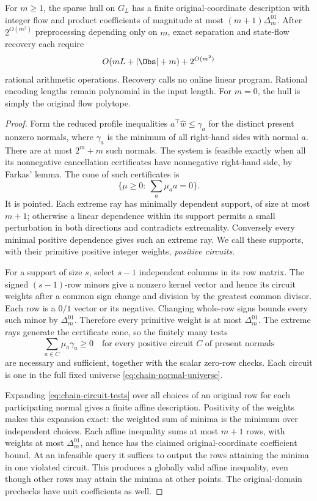 \begin{theorem}\label{thm:fixed-chain}
For $m\ge1$, the sparse hull on $G_L$ has a finite
original-coordinate description with integer flow and product
coefficients of magnitude at most $(m+1)\Delta^{01}_m$.
After $2^{O(m^2)}$ preprocessing depending only on $m$, exact
separation and state-flow recovery each require
\[
 O(mL+|\Obs|+m)+2^{O(m^2)}
\]
rational arithmetic operations. Recovery calls no online linear
program. Rational encoding lengths remain polynomial in the input
length. For $m=0$, the hull is simply the original flow polytope.
\end{theorem}
\begin{proof}
Form the reduced profile inequalities
$a^\top\widehat w\le\gamma_a$ for the distinct present nonzero
normals, where $\gamma_a$ is the minimum of all right-hand sides
with normal $a$. There are at most $2^m+m$ such normals.
The system is feasible exactly when all its nonnegative cancellation
certificates have nonnegative right-hand side, by Farkas' lemma.
The cone of such certificates is
\[
 \{\mu\ge0:\ \sum_a\mu_a a=0\}.
\]
It is pointed. Each extreme ray has minimally dependent support,
of size at most $m+1$; otherwise a linear dependence within its
support permits a small perturbation in both directions and contradicts
extremality. Conversely every minimal positive dependence gives such
an extreme ray. We call these supports, with their primitive positive
integer weights, \emph{positive circuits}.

For a support of size $s$, select $s-1$ independent columns in
its row matrix. The signed $(s-1)$-row minors give a nonzero kernel
vector and hence its circuit weights after a common sign change and
division by the greatest common divisor. Each row is a $0/1$ vector
or its negative. Changing whole-row signs bounds every such minor
by $\Delta^{01}_m$. Therefore every primitive weight is at most
$\Delta^{01}_m$. The extreme rays generate the certificate cone, so
the finitely many tests
\begin{equation}\label{eq:chain-circuit-tests}
 \sum_{a\in C}\mu_a\gamma_a\ge0
 \quad\text{for every positive circuit $C$ of present normals}
\end{equation}
are necessary and sufficient, together with the scalar zero-row
checks. Each circuit is one in the full fixed universe
\eqref{eq:chain-normal-universe}.

Expanding \eqref{eq:chain-circuit-tests} over all choices of an
original row for each participating normal gives a finite affine
description. Positivity of the weights makes this expansion exact:
the weighted sum of minima is the minimum over independent choices.
Each affine inequality sums at most $m+1$ rows, with weights at
most $\Delta^{01}_m$, and hence has the claimed original-coordinate
coefficient bound. At an infeasible query it suffices to output the
rows attaining the minima in one violated circuit. This produces
a globally valid affine inequality, even though other rows may
attain the minima at other points. The original-domain prechecks
have unit coefficients as well.


\end{proof}
